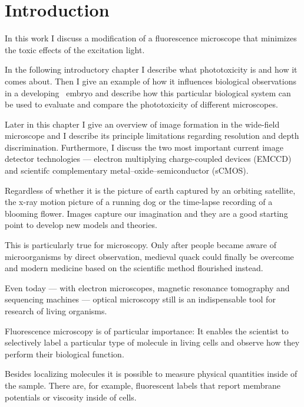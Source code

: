 \chapter{Introduction}
\label{sec:intro}
\begin{summary}
  In this work I discuss a modification of a fluorescence microscope    
  that minimizes the toxic effects of the excitation light.

  In the following introductory chapter I describe what phototoxicity   
  is and how it comes about. Then I give an example of how it
  influences biological observations in a developing \celegans\ 
  embryo and describe how this particular biological system can be
  used to evaluate and compare the phototoxicity of different microscopes.

  Later in this chapter I give an overview of image formation   
  in the wide-field microscope and I describe its principle limitations
  regarding resolution and depth discrimination. Furthermore, I
  discuss the two most important current image detector technologies
  --- electron multiplying charge-coupled devices (EMCCD) and
  scientifc complementary metal–oxide–semiconductor (sCMOS).
\end{summary}
Regardless of whether it is the picture of earth captured by an
orbiting satellite, the x-ray motion picture of a running dog or the
time-lapse recording of a blooming flower. Images capture our
imagination and they are a good starting point to develop new models
and theories.

This is particularly true for microscopy.  Only after people became
aware of microorganisms by direct observation, medieval quack could
finally be overcome and modern medicine based on the scientific
method flourished instead.

Even today --- with electron microscopes, magnetic resonance
tomography and sequencing machines --- optical microscopy still is an
indispensable tool for research of living organisms.

Fluorescence microscopy is of particular importance: It enables the     
scientist to selectively label a particular type of molecule in living cells
and observe how they perform their biological function.

Besides localizing molecules it is possible to measure physical
quantities inside of the sample. There are, for example, fluorescent
labels that report membrane potentials or viscosity inside of cells.

